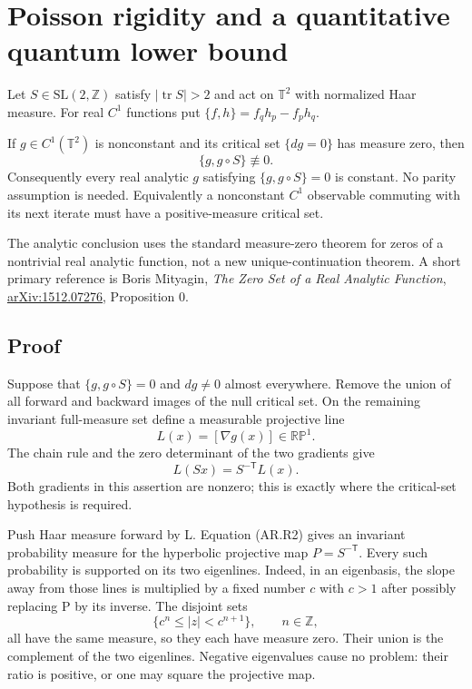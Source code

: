 \section{Poisson rigidity and a quantitative quantum lower bound}\label{sec:analytic}
Let \(S\in\mathrm{SL}(2,\mathbb Z)\) satisfy \(|\operatorname{tr}S|>2\) and act on \(\mathbb T^2\) with normalized Haar measure. For real \(C^1\) functions put \(\{f,h\}=f_qh_p-f_ph_q\).

\begin{theorem}\label{pass1:analytic-1} If \(g\in C^1(\mathbb T^2)\) is nonconstant and its critical set \(\{dg=0\}\) has measure zero, then \[
                  \{g,g\circ S\}\not\equiv0.                 \tag{AR.R1}
\] Consequently every real analytic \(g\) satisfying \(\{g,g\circ S\}=0\) is constant. No parity assumption is needed. Equivalently a nonconstant \(C^1\) observable commuting with its next iterate must have a positive-measure critical set.
\end{theorem}

The analytic conclusion uses the standard measure-zero theorem for zeros of a nontrivial real analytic function, not a new unique-continuation theorem. A short primary reference is Boris Mityagin, \emph{The Zero Set of a Real Analytic Function}, \href{https://arxiv.org/abs/1512.07276}{arXiv:1512.07276}, Proposition 0.

\subsection{Proof}\label{analytic:proof}

Suppose that \(\{g,g\circ S\}=0\) and \(dg\ne0\) almost everywhere. Remove the union of all forward and backward images of the null critical set. On the remaining invariant full-measure set define a measurable projective line \[
                    L(x)=[\nabla g(x)]\in\mathbb {RP}^1.
\] The chain rule and the zero determinant of the two gradients give \[
       L(Sx)=S^{-\mathsf T}L(x).                             \tag{AR.R2}
\] Both gradients in this assertion are nonzero; this is exactly where the critical-set hypothesis is required.

Push Haar measure forward by L. Equation (AR.R2) gives an invariant probability measure for the hyperbolic projective map \(P=S^{-\mathsf T}\). Every such probability is supported on its two eigenlines. Indeed, in an eigenbasis, the slope away from those lines is multiplied by a fixed number \(c\) with \(c>1\) after possibly replacing P by its inverse. The disjoint sets \[
          \{c^n\leq |z|<c^{n+1}\},\qquad n\in\mathbb Z,
\] all have the same measure, so they each have measure zero. Their union is the complement of the two eigenlines. Negative eigenvalues cause no problem: their ratio is positive, or one may square the projective map.

